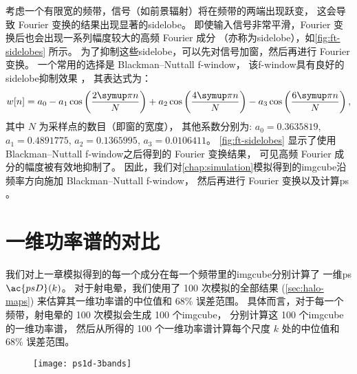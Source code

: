 考虑一个有限宽的频带，信号（如前景辐射）将在频带的两端出现跃变，
这会导致 Fourier 变换的结果出现显著的\ac{sidelobe}。
即使输入信号非常平滑，Fourier 变换后也会出现一系列幅度较大的高频 Fourier 成分
（亦称为\ac{sidelobe}），如\autoref{fig:ft-sidelobes} 所示。
为了抑制这些\ac{sidelobe}，可以先对信号加窗，然后再进行 Fourier 变换。
一个常用的选择是 Blackman--Nuttall \ac{f-window}，
该\ac{f-window}具有良好的\ac{sidelobe}抑制效果 \cite{nuttall1981}，
其表达式为：
\begin{equation}
  \label{eq:bn-window}
  w[n] = a_0 - a_1 \cos\left(\frac{2\Cpi n}{N}\right)
    + a_2 \cos\left(\frac{4\Cpi n}{N}\right)
    - a_3 \cos\left(\frac{6\Cpi n}{N}\right) ,
\end{equation}
其中
$N$ 为采样点的数目（即窗的宽度），
其他系数分别为:
$a_0 = \num{0.3635819}$,
$a_1 = \num{0.4891775}$,
$a_2 = \num{0.1365995}$,
$a_3 = \num{0.0106411}$。
\autoref{fig:ft-sidelobes} 显示了使用 Blackman--Nuttall
\ac{f-window}之后得到的 Fourier 变换结果，
可见高频 Fourier 成分的幅度被有效地抑制了。
因此，我们对\autoref{chap:simulation}模拟得到的\ac{imgcube}沿频率方向施加
Blackman--Nuttall \ac{f-window}，
然后再进行 Fourier 变换以及计算\ac{ps} \cite{trott2015,chapman2016}。


\section{一维功率谱的对比}
\label{sec:ps1d}

我们对上一章模拟得到的每一个成分在每一个频带里的\ac{imgcube}分别计算了
一维\ac{ps} $\ac{psD}(k)$。
对于射电晕，我们使用了 100 次模拟的全部结果 (\autoref{sec:halo-maps}) 
来估算其一维功率谱的中位值和 68\% 误差范围。
具体而言，对于每一个频带，射电晕的 100 次模拟会生成 100 个\ac{imgcube}，
分别计算这 100 个\ac{imgcube}的一维功率谱，
然后从所得的 100 个一维功率谱计算每个尺度 $k$ 处的中位值和 68\% 误差范围。

\begin{figure}[htp]
  \centering
  \texttt{[image: ps1d-3bands]}
  \label{fig:ps1d-3bands}
\end{figure}

